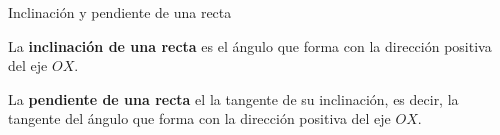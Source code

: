 \documentclass[8pt]{beamer}
\begin{document}
\begin{frame}[t]{Inclinación y pendiente de una recta}

La \textbf{inclinación de una recta} es el ángulo que forma con la dirección positiva del eje $OX$.

La \textbf{pendiente de una recta} el la tangente de su inclinación, es decir, la tangente del ángulo que forma con la dirección positiva del eje $OX$.

\begin{columns}
\begin{center}
\end{center}


\end{columns}
\end{frame}
\end{document}
